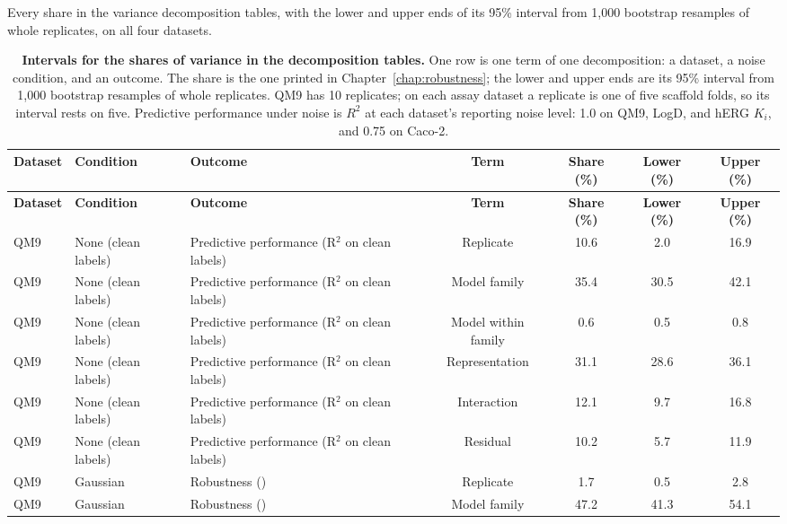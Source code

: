 \begin{landscape}
\label{app:noise:sec:variance_intervals}
Every share in the variance decomposition tables, with the lower and upper ends of its 95\% interval from 1,000 bootstrap resamples of whole replicates, on all four datasets.
{\AFtablefont
\begin{longtable}{lllcccc}
\caption{\textbf{Intervals for the shares of variance in the decomposition tables.}
One row is one term of one decomposition: a dataset, a noise condition, and an outcome. The share is the one printed in Chapter~\ref{chap:robustness}; the lower and upper ends are its 95\% interval from 1,000 bootstrap resamples of whole replicates. QM9 has 10 replicates; on each assay dataset a replicate is one of five scaffold folds, so its interval rests on five. Predictive performance under noise is $R^2$ at each dataset's reporting noise level: 1.0 on QM9, LogD, and hERG $K_i$, and 0.75 on Caco-2.}
\label{app:noise:variance_intervals}\\
\toprule
\textbf{Dataset} & \textbf{Condition} & \textbf{Outcome} & \textbf{Term} & \textbf{Share (\%)} & \textbf{Lower (\%)} & \textbf{Upper (\%)} \\
\midrule
\endfirsthead
\toprule
\textbf{Dataset} & \textbf{Condition} & \textbf{Outcome} & \textbf{Term} & \textbf{Share (\%)} & \textbf{Lower (\%)} & \textbf{Upper (\%)} \\
\midrule
\endhead
QM9 & None (clean labels) & Predictive performance (R$^2$ on clean labels) & Replicate & 10.6 & 2.0 & 16.9 \\
QM9 & None (clean labels) & Predictive performance (R$^2$ on clean labels) & Model family & 35.4 & 30.5 & 42.1 \\
QM9 & None (clean labels) & Predictive performance (R$^2$ on clean labels) & Model within family & 0.6 & 0.5 & 0.8 \\
QM9 & None (clean labels) & Predictive performance (R$^2$ on clean labels) & Representation & 31.1 & 28.6 & 36.1 \\
QM9 & None (clean labels) & Predictive performance (R$^2$ on clean labels) & Interaction & 12.1 & 9.7 & 16.8 \\
QM9 & None (clean labels) & Predictive performance (R$^2$ on clean labels) & Residual & 10.2 & 5.7 & 11.9 \\
QM9 & Gaussian & Robustness (\aucnorm{}) & Replicate & 1.7 & 0.5 & 2.8 \\
QM9 & Gaussian & Robustness (\aucnorm{}) & Model family & 47.2 & 41.3 & 54.1 \\

\end{longtable}}
\end{landscape}
